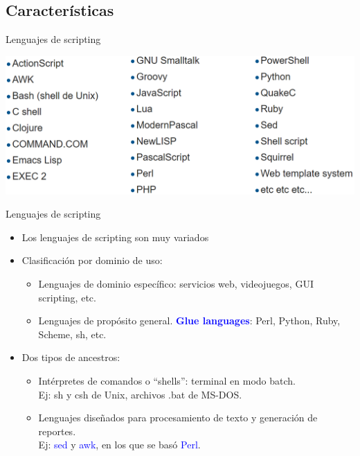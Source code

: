 \documentclass[handout]{beamer} %
\newcommand{\blue}[1]{\textcolor{blue}{#1}}
\begin{document}
\subsection{Características}

\begin{frame}{Lenguajes de scripting}

  \includegraphics[width=\textwidth]{./image/cap9/lenguajes-scripting.png}
\end{frame}

\begin{frame}{Lenguajes de scripting}
  \begin{itemize}
    \item<1-> Los lenguajes de scripting son muy variados
    \item<2-> Clasificación por dominio de uso:
    \begin{itemize}
        \item Lenguajes de dominio específico: servicios web, videojuegos, GUI scripting, etc.
        \item Lenguajes de propósito general. \textbf{\blue{Glue languages}}: Perl, Python, Ruby, Scheme, sh, etc.
    \end{itemize}
    \item<3-> Dos tipos de ancestros:
    \begin{itemize}
        \item Intérpretes de comandos o ``shells'': terminal en modo batch.\\Ej: sh y csh de Unix, archivos .bat de MS-DOS.
        \item Lenguajes diseñados para procesamiento de texto y generación de reportes.\\
        Ej: \blue{sed} y \blue{awk}, en los que se basó \blue{Perl}.
    \end{itemize}
  \end{itemize}
\end{frame}
\end{document}
